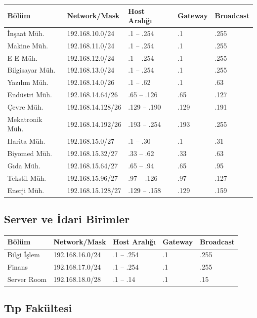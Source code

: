 \documentclass[12pt,a4paper]{article}
\begin{document}
\begin{longtable}{lllll}
\toprule
\textbf{Bölüm} & \textbf{Network/Mask} & \textbf{Host Aralığı} & \textbf{Gateway} & \textbf{Broadcast} \\
\midrule
\endhead
İnşaat Müh. & 192.168.10.0/24 & .1 -- .254 & .1 & .255 \\
Makine Müh. & 192.168.11.0/24 & .1 -- .254 & .1 & .255 \\
E-E Müh. & 192.168.12.0/24 & .1 -- .254 & .1 & .255 \\
Bilgisayar Müh. & 192.168.13.0/24 & .1 -- .254 & .1 & .255 \\
Yazılım Müh. & 192.168.14.0/26 & .1 -- .62 & .1 & .63 \\
Endüstri Müh. & 192.168.14.64/26 & .65 -- .126 & .65 & .127 \\
Çevre Müh. & 192.168.14.128/26 & .129 -- .190 & .129 & .191 \\
Mekatronik Müh. & 192.168.14.192/26 & .193 -- .254 & .193 & .255 \\
Harita Müh. & 192.168.15.0/27 & .1 -- .30 & .1 & .31 \\
Biyomed Müh. & 192.168.15.32/27 & .33 -- .62 & .33 & .63 \\
Gıda Müh. & 192.168.15.64/27 & .65 -- .94 & .65 & .95 \\
Tekstil Müh. & 192.168.15.96/27 & .97 -- .126 & .97 & .127 \\
Enerji Müh. & 192.168.15.128/27 & .129 -- .158 & .129 & .159 \\
\bottomrule
\end{longtable}

\subsection{Server ve İdari Birimler}

\begin{longtable}{lllll}
\toprule
\textbf{Bölüm} & \textbf{Network/Mask} & \textbf{Host Aralığı} & \textbf{Gateway} & \textbf{Broadcast} \\
\midrule
\endhead
Bilgi İşlem & 192.168.16.0/24 & .1 -- .254 & .1 & .255 \\
Finans & 192.168.17.0/24 & .1 -- .254 & .1 & .255 \\
Server Room & 192.168.18.0/28 & .1 -- .14 & .1 & .15 \\
\bottomrule
\end{longtable}

\subsection{Tıp Fakültesi}
\end{document}
